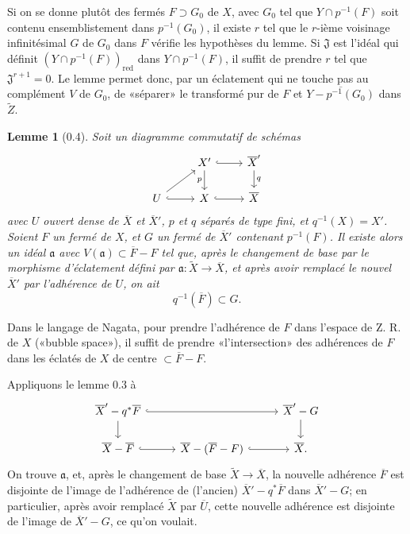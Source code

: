 \documentclass[10pt,a4paper]{article}
\newcommand{\red}{\mathrm{red}}
\theoremstyle{deligne}
\newtheorem*{lemma*}{Lemme}
\newcommand{\heading}[1]{\vspace{0.65em}\noindent{\bfseries #1}\quad}
\begin{document}
\heading{Remarque.}
Si on se donne plutôt des fermés \(F\supset G_0\) de \(X\), avec \(G_0\) tel que \(Y\cap p^{-1}(F)\) soit contenu ensemblistement dans \(p^{-1}(G_0)\), il existe \(r\) tel que le \(r\)-ième voisinage infinitésimal \(G\) de \(G_0\) dans \(F\) vérifie les hypothèses du lemme. Si \(\mathfrak J\) est l'idéal qui définit \((Y\cap p^{-1}(F))_{\red}\) dans \(Y\cap p^{-1}(F)\), il suffit de prendre \(r\) tel que \(\mathfrak J^{r+1}=0\). Le lemme permet donc, par un éclatement qui ne touche pas au complément \(V\) de \(G_0\), de «séparer» le transformé pur de \(F\) et \(\overline{Y-p^{-1}(G_0)}\) dans \(\widetilde Z\).

\begin{lemma*}[0.4]
Soit un diagramme commutatif de schémas
\[
\begin{tikzcd}[column sep=2.4em,row sep=1.6em]
& X' \arrow[r,hook] \arrow[d,"p"'] & \overline{X}' \arrow[d,"q"] \\
U \arrow[ur] \arrow[r,hook] & X \arrow[r,hook] & \overline X
\end{tikzcd}
\]
avec \(U\) ouvert dense de \(\overline X\) et \(\overline X'\), \(p\) et \(q\) séparés de type fini, et \(q^{-1}(X)=X'\). Soient \(F\) un fermé de \(X\), et \(G\) un fermé de \(\overline X'\) contenant \(p^{-1}(F)\). Il existe alors un idéal \(\mathfrak a\) avec \(V(\mathfrak a)\subset \overline F-F\) tel que, après le changement de base par le morphisme d'éclatement défini par \(\mathfrak a:\widetilde X\to\overline X\), et après avoir remplacé le nouvel \(\overline X'\) par l'adhérence de \(U\), on ait
\[
q^{-1}(\overline F)\subset G.
\]
\end{lemma*}
Dans le langage de Nagata, pour prendre l'adhérence de \(F\) dans l'espace de Z. R. de \(X\) («bubble space»), il suffit de prendre «l'intersection» des adhérences de \(F\) dans les éclatés de \(X\) de centre \(\subset \overline F-F\).

Appliquons le lemme 0.3 à
\[
\begin{tikzcd}[column sep=2.7em,row sep=1.6em]
\overline X'-q^*\overline F \arrow[rr,hook] \arrow[d] && \overline X'-G \arrow[d] \\
\overline X-\overline F \arrow[r,hook] & \overline X-(\overline F-F) \arrow[r,hook] & \overline X .
\end{tikzcd}
\]
On trouve \(\mathfrak a\), et, après le changement de base \(\widetilde X\to\overline X\), la nouvelle adhérence \(\overline F\) est disjointe de l'image de l'adhérence de (l'ancien) \(\overline X'-q^*\overline F\) dans \(\overline X'-G\); en particulier, après avoir remplacé \(\widetilde X\) par \(\overline U\), cette nouvelle adhérence est disjointe de l'image de \(\overline X'-G\), ce qu'on voulait.
\end{document}

